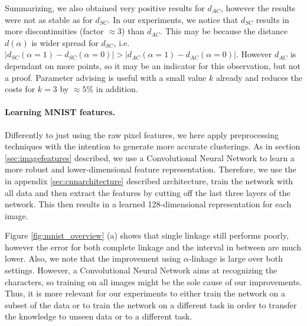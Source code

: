 Summarizing, we also obtained very positive results for $d_{AC}$, however the results were not as stable as for $d_{SC}$. In our experiments, we notice that $d_{SC}$ results in more discontinuities (factor $\approx 3$) than $d_{AC}$. This may be because the distance $d(\alpha)$ is wider spread for $d_{SC}$, i.e. $|d_{SC}(\alpha = 1) - d_{SC}(\alpha = 0)| > |d_{AC}(\alpha = 1) - d_{AC}(\alpha = 0)|$. However $d_{AC}$ is dependant on more points, so it may be an indicator for this observation, but not a proof. Parameter advising is useful with a small value $k$ already and reduces the costs for $k = 3$ by $\approx 5\%$ in addition.

\paragraph{Learning MNIST features.} Differently to just using the raw pixel features, we here apply preprocessing techniques with the intention to generate more accurate clusterings. As in section \ref{sec:imagefeatures} described, we use a Convolutional Neural Network to learn a more robust and lower-dimensional feature representation. Therefore, we use the in appendix \ref{sec:cnnarchitecture} described architecture, train the network with all data and then extract the features by cutting off the last three layers of the network. This then results in a learned 128-dimensional representation for each image.

Figure \ref{fig:mnist_overview} (a) shows that single linkage still performs poorly, however the error for both complete linkage and the interval in between are much lower. Also, we note that the improvement using $\alpha$-linkage is large over both settings. However, a Convolutional Neural Network aims at recognizing the characters, so training on all images might be the sole cause of our improvements. Thus, it is more relevant for our experiments to either train the network on a subset of the data or to train the network on a different task in order to transfer the knowledge to unseen data or to a different task.

